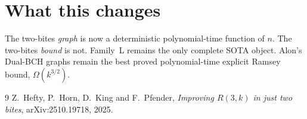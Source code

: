 \documentclass[11pt]{article}
\theoremstyle{definition}
\begin{document}
\section{What this changes}

The two-bites \emph{graph} is now a deterministic polynomial-time function of
$n$.
The two-bites \emph{bound} is not.
Family~L remains the only complete SOTA object.
Alon's Dual-BCH graphs remain the best proved polynomial-time explicit
Ramsey bound, $\Omega(k^{3/2})$.

\begin{thebibliography}{9}
Z.~Hefty, P.~Horn, D.~King and F.~Pfender,
\emph{Improving $R(3,k)$ in just two bites},
arXiv:2510.19718, 2025.
\end{thebibliography}
\end{document}
